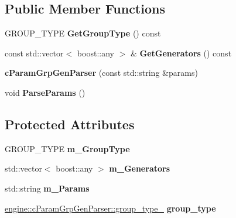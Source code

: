 \subsection*{Public Member Functions}
\begin{DoxyCompactItemize}
\item 
\hypertarget{classengine_1_1cParamGrpGenParser_aef7eee0ed4cda2da8e7b7e18d538005f}{G\-R\-O\-U\-P\-\_\-\-T\-Y\-P\-E {\bfseries Get\-Group\-Type} () const }\label{classengine_1_1cParamGrpGenParser_aef7eee0ed4cda2da8e7b7e18d538005f}

\item 
\hypertarget{classengine_1_1cParamGrpGenParser_a77b35ea5df765859b0bb132bfade9d37}{const std\-::vector$<$ boost\-::any $>$ \& {\bfseries Get\-Generators} () const }\label{classengine_1_1cParamGrpGenParser_a77b35ea5df765859b0bb132bfade9d37}

\item 
\hypertarget{classengine_1_1cParamGrpGenParser_ab2b4e98606a9a573e6a9e0aacc1ccda2}{{\bfseries c\-Param\-Grp\-Gen\-Parser} (const std\-::string \&params)}\label{classengine_1_1cParamGrpGenParser_ab2b4e98606a9a573e6a9e0aacc1ccda2}

\item 
\hypertarget{classengine_1_1cParamGrpGenParser_ab815bca7423e45618397388f819d1bb4}{void {\bfseries Parse\-Params} ()}\label{classengine_1_1cParamGrpGenParser_ab815bca7423e45618397388f819d1bb4}

\end{DoxyCompactItemize}
\subsection*{Protected Attributes}
\begin{DoxyCompactItemize}
\item 
\hypertarget{classengine_1_1cParamGrpGenParser_a074efb8aeee090408d5652c10026d57c}{G\-R\-O\-U\-P\-\_\-\-T\-Y\-P\-E {\bfseries m\-\_\-\-Group\-Type}}\label{classengine_1_1cParamGrpGenParser_a074efb8aeee090408d5652c10026d57c}

\item 
\hypertarget{classengine_1_1cParamGrpGenParser_a3a21e764a50a1b585b13642656907185}{std\-::vector$<$ boost\-::any $>$ {\bfseries m\-\_\-\-Generators}}\label{classengine_1_1cParamGrpGenParser_a3a21e764a50a1b585b13642656907185}

\item 
\hypertarget{classengine_1_1cParamGrpGenParser_aef8599c3da5a31d46e7cc148709e4b08}{std\-::string {\bfseries m\-\_\-\-Params}}\label{classengine_1_1cParamGrpGenParser_aef8599c3da5a31d46e7cc148709e4b08}

\item 
\hypertarget{classengine_1_1cParamGrpGenParser_aea116d654593bbeaa3bbe44b9e860795}{\hyperlink{structengine_1_1cParamGrpGenParser_1_1group__type__}{engine\-::c\-Param\-Grp\-Gen\-Parser\-::group\-\_\-type\-\_\-} {\bfseries group\-\_\-type}}\label{classengine_1_1cParamGrpGenParser_aea116d654593bbeaa3bbe44b9e860795}

\end{DoxyCompactItemize}


